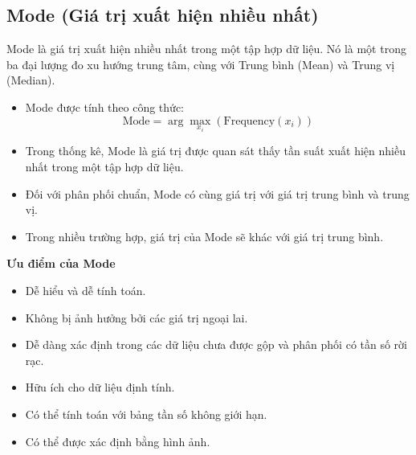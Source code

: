 \subsection {Mode (Giá trị xuất hiện nhiều nhất)}
\label{stat:mode}

Mode  là giá trị xuất hiện nhiều nhất trong một tập hợp dữ liệu.
Nó là một trong ba đại lượng đo xu hướng trung tâm, cùng với Trung bình (Mean) và Trung vị (Median).

\begin{itemize}
    \item Mode được tính theo công thức:
    \begin{equation}
        \label{eq:Mode}
        \text{Mode} = \arg\max_{x_i} \left( \text{Frequency}(x_i) \right)
    \end{equation}
\end{itemize}

\begin{itemize}[noitemsep, topsep=0pt]
    \item Trong thống kê, Mode là giá trị được quan sát thấy tần suất xuất hiện nhiều nhất trong một tập hợp dữ liệu.

    \item Đối với phân phối chuẩn, Mode có cùng giá trị với giá trị trung bình và trung vị.

    \item Trong nhiều trường hợp, giá trị của Mode sẽ khác với giá trị trung bình. 
\end{itemize}

\textbf{Ưu điểm của Mode}
\begin{itemize}[noitemsep, topsep=0pt]
    \item Dễ hiểu và dễ tính toán.

    \item Không bị ảnh hưởng bởi các giá trị ngoại lai.

    \item Dễ dàng xác định trong các dữ liệu chưa được gộp và phân phối có tần số rời rạc.

    \item Hữu ích cho dữ liệu định tính.

    \item Có thể tính toán với bảng tần số không giới hạn.

    \item Có thể được xác định bằng hình ảnh.
\end{itemize}

